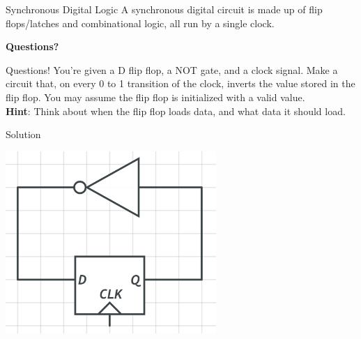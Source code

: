 \documentclass[aspectratio=169, 11pt, handout]{beamer}
\begin{document}
\begin{frame}{Synchronous Digital Logic}
    A synchronous digital circuit is made up of flip flops/latches and combinational logic, all run by a single clock.\\
    
\end{frame}



\begin{frame}{}
      \begin{center}
    {\color{sigma@mainblue} \bfseries\LARGE Questions?}
  \end{center}
\end{frame}

\begin{frame}{Questions!}
You're given a D flip flop, a NOT gate, and a clock signal. Make a circuit that, on every 0 to 1 transition of the clock, inverts the value stored in the flip flop. You may assume the flip flop is initialized with a valid value.\\

\textbf{Hint}: Think about when the flip flop loads data, and what data it should load.
\end{frame}

\begin{frame}{Solution}
    \begin{center}
        \includegraphics[width=0.6\textwidth]{dff_not.png}
    \end{center}
\end{frame}
\end{document}
